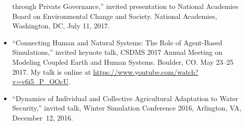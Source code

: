 \documentclass[10pt]{article}
\begin{document}
\begin{itemize}
through Private Governance,'' invited presentation to National Academies
Board on Environmental Change and Society. National Academies, Washington,
DC, July 11, 2017.
\item  ``Connecting Human and Natural Systems: The Role of Agent-Based
Simulations,'' invited keynote talk, CSDMS 2017 Annual Meeting on Modeling
Coupled Earth and Human Systems. Boulder, CO. May 23--25 2017.
My talk is online at
\url{https://www.youtube.com/watch?v=v6i5_P_OOcU}.
\item  ``Dynamics of Individual and Collective Agricultural Adaptation to Water
Security,'' invited talk, Winter Simulation Conference 2016, Arlington, VA,
December~12, 2016.
   \end{itemize}
\end{document}
